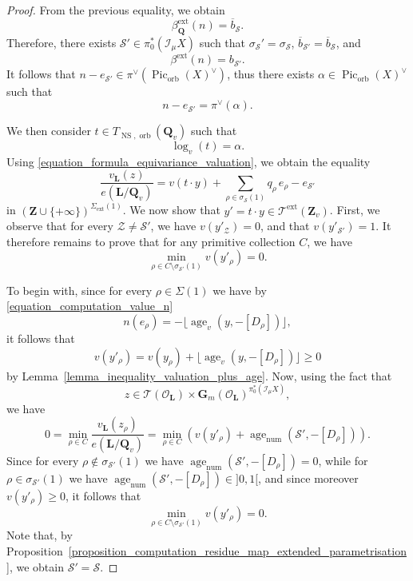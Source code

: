 \documentclass[10pt,a4paper]{amsart}
\newcommand{\G}{\mathbf{G}}
\newcommand{\Le}{\mathbf{L}}
\DeclareMathOperator{\NS}{NS}
\DeclareMathOperator{\Pic}{Pic}
\newcommand{\Q}{\mathbf{Q}}
\newcommand{\Z}{\mathbf{Z}}
\DeclareMathOperator{\age}{age}
\DeclareMathOperator{\ext}{ext}
\DeclareMathOperator{\num}{num}
\DeclareMathOperator{\orb}{orb}
\newcommand{\sheafI}{\mathcal{I}}
\newcommand{\sheafO}{\mathcal{O}}
\newcommand{\stackS}{\mathcal{S}}
\newcommand{\stackT}{\mathcal{T}}
\newcommand{\stackZ}{\mathcal{Z}}
\newcommand{\twistsector}{\pi_0^*(\sheafI_{\mu} X)}
\begin{document}
\begin{proof}
From the previous equality, we obtain
\[
\beta^{\ext}_{\Q}(n) = \overline b_{\stackS}.
\]
Therefore, there exists $\stackS' \in \twistsector$ such that
$\sigma_\stackS' = \sigma_\stackS$,
$\overline b_{\stackS'} = \overline b_{\stackS}$, and
\[
\beta^{\ext}(n) = b_{\stackS'}.
\]
It follows that $n - e_{\stackS'} \in \pi^{\vee}\left(\Pic_{\orb}(X)^{\vee}\right)$, thus there exists $\alpha \in \Pic_{\orb}(X)^{\vee}$ such that
\[
n - e_{\stackS'} = \pi^{\vee}\left(\alpha\right).
\]

We then consider $t \in T_{\NS,\orb}(\Q_v)$ such that
\[
\log_v(t) = \alpha.
\]
Using \eqref{equation_formula_equivariance_valuation}, we obtain the equality
\[
\frac{v_{\Le}(z)}{e(\Le/\Q_v)}
=
v(t \cdot y)
+
\sum_{\rho \in \sigma_\stackS(1)} q_{\rho}\, e_{\rho}
-
e_{\stackS'}
\]
in $\left( \Z \cup \{+\infty\} \right)^{\Sigma_{\ext}(1)}$. We now show that $y' = t \cdot y \in \stackT^{\ext}(\Z_v)$. First, we observe that for
every $\stackZ \neq \stackS'$, we have $v(y'_{\stackZ}) = 0$, and that
$v(y'_{\stackS'}) = 1$. It therefore remains to prove that for any primitive
collection $C$, we have
\[
\min_{\rho \in C \setminus \sigma_{\stackS'}(1)} v(y'_{\rho}) = 0 .
\]

To begin with, since for every $\rho \in \Sigma(1)$ we have by \eqref{equation_computation_value_n}
\[
n(e_{\rho}) = - \lfloor \age_v(y,-[D_{\rho}]) \rfloor,
\]
it follows that
\[
v(y'_{\rho})
=
v(y_{\rho}) + \lfloor \age_v(y,-[D_{\rho}]) \rfloor
\geqslant 0
\]
by Lemma~\ref{lemma_inequality_valuation_plus_age}. Now, using the fact that
\[
z \in \stackT(\sheafO_{\Le}) \times \G_m(\sheafO_{\Le})^{\twistsector},
\]
we have
\[
0
=
\min_{\rho \in C}
\frac{v_{\Le}(z_{\rho})}{e(\Le/\Q_v)}
=
\min_{\rho \in C}
\left(
v(y'_{\rho}) + \age_{\num}\!\left(\stackS',-[D_{\rho}]\right)
\right).
\]
Since for every $\rho \notin \sigma_{\stackS'}(1)$ we have
$\age_{\num}\!\left(\stackS',-[D_{\rho}]\right) = 0$, while for
$\rho \in \sigma_{\stackS'}(1)$ we have
$\age_{\num}\!\left(\stackS',-[D_{\rho}]\right) \in ]0,1[$, and since moreover
$v(y'_{\rho}) \geqslant 0$, it follows that
\[
\min_{\rho \in C \setminus \sigma_{\stackS'}(1)} v(y'_{\rho}) = 0 .
\]Note that, by Proposition~\ref{proposition_computation_residue_map_extended_parametrisation},
we obtain $\stackS' = \stackS$.

\end{proof}
\end{document}
